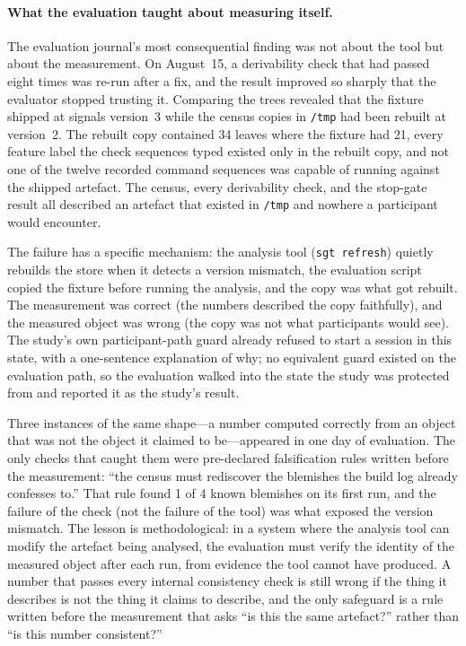 \paragraph{What the evaluation taught about measuring itself.}
The evaluation journal's most consequential finding was not about the tool but
about the measurement. On August~15, a derivability check that had passed eight
times was re-run after a fix, and the result improved so sharply that the
evaluator stopped trusting it. Comparing the trees revealed that the fixture
shipped at signals version~3 while the census copies in \texttt{/tmp} had been
rebuilt at version~2. The rebuilt copy contained 34 leaves where the fixture had
21, every feature label the check sequences typed existed only in the rebuilt
copy, and not one of the twelve recorded command sequences was capable of
running against the shipped artefact. The census, every derivability check, and the stop-gate result all
described an artefact that existed in \texttt{/tmp} and nowhere a participant
would encounter.

The failure has a specific mechanism: the analysis tool (\texttt{sgt refresh})
quietly rebuilds the store when it detects a version mismatch, the evaluation
script copied the fixture before running the analysis, and the copy was what
got rebuilt. The measurement was correct (the numbers described the copy
faithfully), and the measured object was wrong (the copy was not what
participants would see). The study's own participant-path guard already refused
to start a session in this state, with a one-sentence explanation of why; no
equivalent guard existed on the evaluation path, so the evaluation walked into
the state the study was protected from and reported it as the study's result.

Three instances of the same shape---a number computed correctly from an object
that was not the object it claimed to be---appeared in one day of evaluation.
The only checks that caught them were pre-declared falsification rules written
before the measurement: ``the census must rediscover the blemishes the build
log already confesses to.'' That rule found 1 of 4 known blemishes on its
first run, and the failure of the check (not the failure of the tool) was what
exposed the version mismatch. The lesson is methodological: in a system where
the analysis tool can modify the artefact being analysed, the evaluation must
verify the identity of the measured object after each run, from evidence the
tool cannot have produced. A number that passes every internal consistency
check is still wrong if the thing it describes is not the thing it claims to
describe, and the only safeguard is a rule written before the measurement that
asks ``is this the same artefact?'' rather than ``is this number consistent?''

